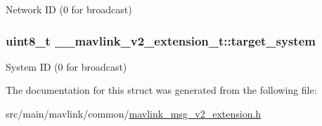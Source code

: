 Network I\+D (0 for broadcast) 

\hypertarget{struct____mavlink__v2__extension__t_acc69c4f849b8bbe37f49400b20835100}{
\subsubsection[{target\+\_\+system}]{\setlength{\rightskip}{0pt plus 5cm}uint8\+\_\+t \+\_\+\+\_\+mavlink\+\_\+v2\+\_\+extension\+\_\+t\+::target\+\_\+system}}\label{struct____mavlink__v2__extension__t_acc69c4f849b8bbe37f49400b20835100}


System I\+D (0 for broadcast) 



The documentation for this struct was generated from the following file\+:\begin{DoxyCompactItemize}
\item 
src/main/mavlink/common/\hyperlink{mavlink__msg__v2__extension_8h}{mavlink\+\_\+msg\+\_\+v2\+\_\+extension.\+h}\end{DoxyCompactItemize}
